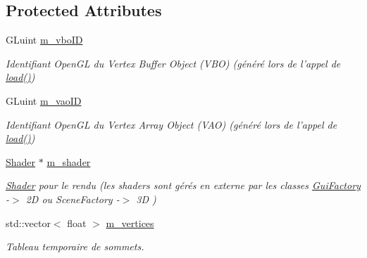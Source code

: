 \subsection*{Protected Attributes}
\begin{DoxyCompactItemize}
\item 
\hypertarget{classAbstractGraphicObject_a7e1566fbd2b769d12dc43ed9a4dd61f1}{G\-Luint \hyperlink{classAbstractGraphicObject_a7e1566fbd2b769d12dc43ed9a4dd61f1}{m\-\_\-vbo\-I\-D}}\label{classAbstractGraphicObject_a7e1566fbd2b769d12dc43ed9a4dd61f1}

\begin{DoxyCompactList}\small\item\em Identifiant Open\-G\-L du Vertex Buffer Object (V\-B\-O) (généré lors de l'appel de \hyperlink{classAbstractGraphicObject_ae0e201a972ea7e97b032bf21f75390a7}{load()}) \end{DoxyCompactList}\item 
\hypertarget{classAbstractGraphicObject_aa0fd0c978efb2e99ef3393afcb779313}{G\-Luint \hyperlink{classAbstractGraphicObject_aa0fd0c978efb2e99ef3393afcb779313}{m\-\_\-vao\-I\-D}}\label{classAbstractGraphicObject_aa0fd0c978efb2e99ef3393afcb779313}

\begin{DoxyCompactList}\small\item\em Identifiant Open\-G\-L du Vertex Array Object (V\-A\-O) (généré lors de l'appel de \hyperlink{classAbstractGraphicObject_ae0e201a972ea7e97b032bf21f75390a7}{load()}) \end{DoxyCompactList}\item 
\hypertarget{classAbstractGraphicObject_a75da74184185de4e01d232a92a2d2b68}{\hyperlink{classShader}{Shader} $\ast$ \hyperlink{classAbstractGraphicObject_a75da74184185de4e01d232a92a2d2b68}{m\-\_\-shader}}\label{classAbstractGraphicObject_a75da74184185de4e01d232a92a2d2b68}

\begin{DoxyCompactList}\small\item\em \hyperlink{classShader}{Shader} pour le rendu (les shaders sont gérés en externe par les classes \hyperlink{classGuiFactory}{Gui\-Factory} -\/$>$ 2\-D ou Scene\-Factory -\/$>$ 3\-D ) \end{DoxyCompactList}\item 
\hypertarget{classAbstractGraphicObject_a302995e5cd2cc5565fbe631194e967e1}{std\-::vector$<$ float $>$ \hyperlink{classAbstractGraphicObject_a302995e5cd2cc5565fbe631194e967e1}{m\-\_\-vertices}}\label{classAbstractGraphicObject_a302995e5cd2cc5565fbe631194e967e1}

\begin{DoxyCompactList}\small\item\em Tableau temporaire de sommets. \end{DoxyCompactList}\end{DoxyCompactItemize}


